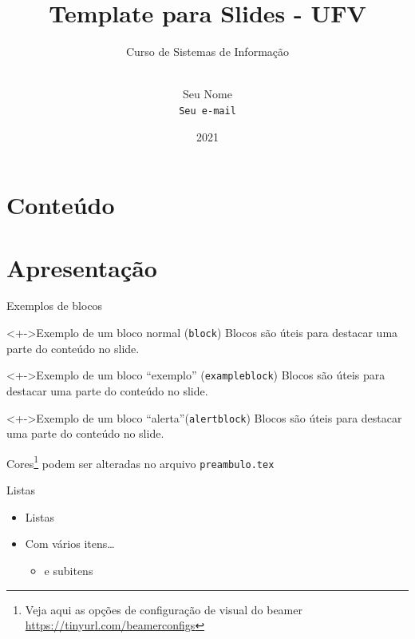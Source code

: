 \documentclass{beamer}
\title{Template para Slides - UFV}
\subtitle{Curso de Sistemas de Informação}
\author[Seu nome aqui]{\texorpdfstring{\logo \\ Seu Nome\\ \texttt{Seu e-mail}}{Seu Nome}}
\institute[UFV-CRP]{Universidade Federal de Viçosa}
\date{2021}
\begin{document}
\transparente

\frame{\titlepage}


\section*{Conteúdo}

\section{Apresentação}

\begin{frame}{Exemplos de blocos}
\begin{block}<+->{Exemplo de um bloco normal (\alert{\texttt{block}})}
	Blocos são úteis para destacar uma parte do conteúdo no slide.
\end{block}
\vfill
\begin{exampleblock}<+->{Exemplo de um bloco ``exemplo'' (\texttt{exampleblock})}
	Blocos são úteis para destacar uma parte do conteúdo no slide. 
\end{exampleblock}
\vfill	
\begin{alertblock}<+->{Exemplo de um bloco ``alerta''(\alert{\texttt{alertblock}})}
	Blocos são úteis para destacar uma parte do conteúdo no slide. 
\end{alertblock}
\vfill
Cores\footnote{Veja aqui as opções de configuração de visual do beamer \url{https://tinyurl.com/beamerconfigs}} podem ser alteradas no arquivo \texttt{preambulo.tex}
\end{frame}

\begin{frame}{Listas}
	\begin{itemize}[<+->]
		\item Listas
		\vfill
		\item Com vários itens\dots
		\begin{itemize}
			\item e subitens
		\end{itemize}
	\end{itemize}
\end{frame}
\end{document}
